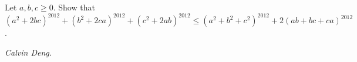 Let $a,b,c\ge0$. Show that $(a^2+2bc)^{2012}+(b^2+2ca)^{2012}+(c^2+2ab)^{2012}\le (a^2+b^2+c^2)^{2012}+2(ab+bc+ca)^{2012}$.

\textit{Calvin Deng.}